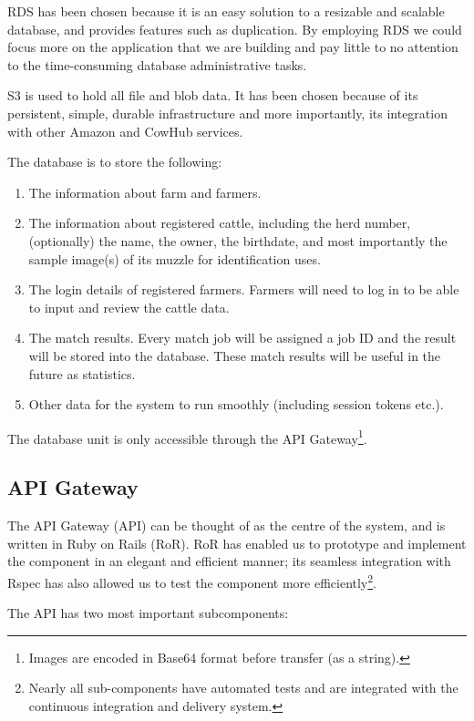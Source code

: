 RDS has been chosen because it is an easy solution to a resizable and scalable database, and provides features such as duplication. By employing RDS we could focus more on the application that we are building and pay little to no attention to the time-consuming database administrative tasks.

S3 is used to hold all file and blob data. It has been chosen because of its persistent, simple, durable infrastructure and more importantly, its integration with other Amazon and CowHub services.

The database is to store the following:

\begin{enumerate}
	\item The information about farm and farmers. 
	\item The information about registered cattle, including the herd number, (optionally) the name, the owner, the birthdate, and most importantly the sample image(s) of its muzzle for identification uses.
	\item The login details of registered farmers. Farmers will need to log in to be able to input and review the cattle data.
	\item The match results. Every match job will be assigned a job ID and the result will be stored into the database. These match results will be useful in the future as statistics.
	\item Other data for the system to run smoothly (including session tokens etc.). 
\end{enumerate}

The database unit is only accessible through the API Gateway\footnote{Images are encoded in Base64 format before transfer (as a string).}.

\subsection{API Gateway}
The API Gateway (API) can be thought of as the centre of the system, and is written in Ruby on Rails (RoR). RoR has enabled us to prototype and implement the component in an elegant and efficient manner; its seamless integration with Rspec has also allowed us to test the component more efficiently\footnote{Nearly all sub-components have automated tests and are integrated with the continuous integration and delivery system.}.

The API has two most important subcomponents:

